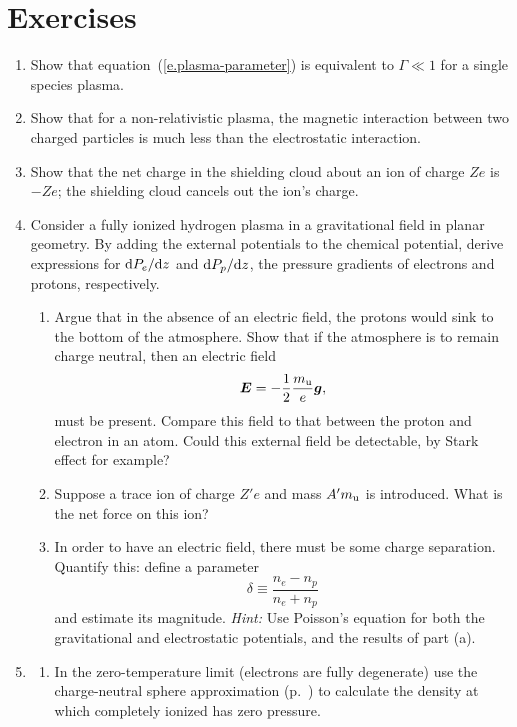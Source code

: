 \section{Exercises}\label{s.plasma-exercises}
\begin{enumerate}
\item Show that equation~(\ref{e.plasma-parameter}) is equivalent to $\Gamma \ll 1$ for a single species plasma.

\item Show that for a non-relativistic plasma, the magnetic interaction between two charged particles is much less than the electrostatic interaction.

\item Show that the net charge in the shielding cloud about an ion of charge $Ze$ is $-Ze$; the shielding cloud cancels out the ion's charge.

\item Consider a fully ionized hydrogen plasma in a gravitational field in planar geometry. By adding the external potentials to the chemical potential, derive expressions for $\mathrm{d} P_{e}/\mathrm{d} z$ and $\mathrm{d} P_{p}/\mathrm{d} z$, the pressure gradients of electrons and protons, respectively.  
\begin{enumerate}
\item Argue that in the absence of an electric field, the protons would sink to the bottom of the atmosphere. Show that if the atmosphere is to remain charge neutral, then an electric field
\[
	\boldsymbol{E} = -\frac{1}{2}\frac{m_\mathrm{u}}{e}\boldsymbol{g},
\]
must be present. Compare this field to that between the proton and electron in an atom.  Could this external field be detectable, by Stark effect for example?

\item Suppose a trace ion of charge $Z'e$ and mass $A'm_\mathrm{u}$ is	 introduced.  What is the net force on this ion?

\item In order to have an electric field, there must be some charge separation.  Quantify this: define a parameter
\[ \delta \equiv \frac{n_{e}-n_{p}}{n_{e} + n_{p}} \]
and estimate its magnitude.  \emph{Hint:} Use Poisson's equation for both the gravitational and electrostatic potentials, and the results of part (a).

\end{enumerate}
\item 
\begin{enumerate} 
\item\label{p.zero-pressure-iron} In the zero-temperature limit (electrons are fully degenerate) use the charge-neutral sphere approximation (p.~\pageref{e.madelung-total}) to calculate the density at which completely ionized \iron[56] has zero pressure.


\end{enumerate}
\end{enumerate}
